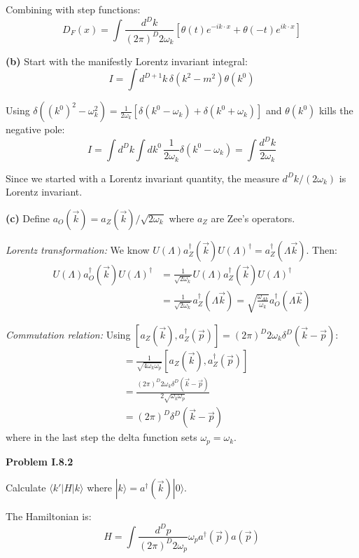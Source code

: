 \documentclass[11pt]{article}
\begin{document}
Combining with step functions:
\[ \boxed{D_F(x) = \int \frac{d^Dk}{(2\pi)^D 2\omega_k} \left[ \theta(t)e^{-ik\cdot x} + \theta(-t)e^{ik\cdot x} \right]} \]

\medskip
\noindent
\textbf{(b)} Start with the manifestly Lorentz invariant integral:
\[ I = \int d^{D+1}k \, \delta(k^2 - m^2) \theta(k^0) \]

Using $\delta((k^0)^2 - \omega_k^2) = \frac{1}{2\omega_k}[\delta(k^0 - \omega_k) + \delta(k^0 + \omega_k)]$ and $\theta(k^0)$ kills the negative pole:
\[ I = \int d^Dk \int dk^0 \, \frac{1}{2\omega_k} \delta(k^0 - \omega_k) = \int \frac{d^Dk}{2\omega_k} \]

Since we started with a Lorentz invariant quantity, the measure $d^Dk/(2\omega_k)$ is Lorentz invariant.

\medskip
\noindent
\textbf{(c)} Define $a_O(\vec{k}) = a_Z(\vec{k})/\sqrt{2\omega_k}$ where $a_Z$ are Zee's operators.

\textit{Lorentz transformation:} We know $U(\Lambda) a_Z^\dagger(\vec{k}) U(\Lambda)^\dagger = a_Z^\dagger(\Lambda\vec{k})$. Then:
\begin{align*}
    U(\Lambda) a_O^\dagger(\vec{k}) U(\Lambda)^\dagger &= \frac{1}{\sqrt{2\omega_k}} U(\Lambda) a_Z^\dagger(\vec{k}) U(\Lambda)^\dagger \\
    &= \frac{1}{\sqrt{2\omega_k}} a_Z^\dagger(\Lambda\vec{k}) = \sqrt{\frac{\omega_{\Lambda k}}{\omega_k}} a_O^\dagger(\Lambda\vec{k})
\end{align*}

\textit{Commutation relation:} Using $[a_Z(\vec{k}), a_Z^\dagger(\vec{p})] = (2\pi)^D 2\omega_k \delta^D(\vec{k}-\vec{p})$:
\begin{align*}
    [a_O(\vec{k}), a_O^\dagger(\vec{p})] &= \frac{1}{\sqrt{4\omega_k \omega_p}} [a_Z(\vec{k}), a_Z^\dagger(\vec{p})] \\
    &= \frac{(2\pi)^D 2\omega_k \delta^D(\vec{k}-\vec{p})}{2\sqrt{\omega_k \omega_p}} \\
    &= (2\pi)^D \delta^D(\vec{k}-\vec{p})
\end{align*}
where in the last step the delta function sets $\omega_p = \omega_k$.

\bigskip
\noindent\textbf{Problem I.8.2}

\medskip
\noindent
Calculate $\langle k'|H|k\rangle$ where $|k\rangle = a^\dagger(\vec{k})|0\rangle$.

The Hamiltonian is:
\[ H = \int \frac{d^Dp}{(2\pi)^D 2\omega_p} \omega_p a^\dagger(\vec{p})a(\vec{p}) \]
\end{document}

